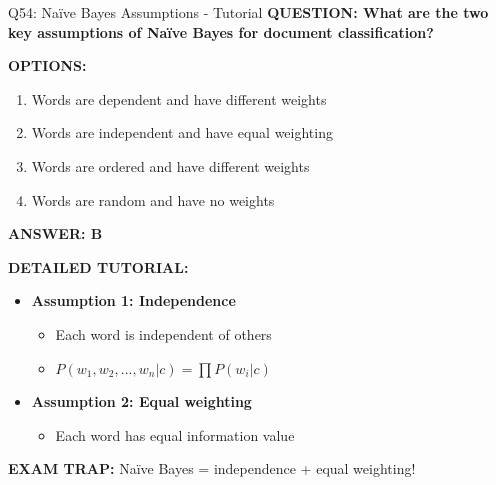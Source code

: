 \documentclass[8pt]{beamer}
\begin{document}
	\begin{frame}{Q54: Naïve Bayes Assumptions - Tutorial}
		\fontsize{6.5}{7.5}\selectfont
		\textbf{QUESTION: What are the two key assumptions of Naïve Bayes for document classification?}
		
		\vspace{0.1cm}
		\textbf{OPTIONS:}
		\begin{enumerate}
			\item Words are dependent and have different weights
			\item Words are independent and have equal weighting
			\item Words are ordered and have different weights
			\item Words are random and have no weights
		\end{enumerate}
		
		\vspace{0.1cm}
		\textcolor{myblue}{\textbf{ANSWER: B}}
		
		\vspace{0.1cm}
		\textbf{DETAILED TUTORIAL:}
		\begin{itemize}
			\item \textbf{Assumption 1: Independence}
			\begin{itemize}
				\item Each word is independent of others
				\item $P(w_1, w_2, ..., w_n|c) = \prod P(w_i|c)$
			\end{itemize}
			\item \textbf{Assumption 2: Equal weighting}
			\begin{itemize}
				\item Each word has equal information value
			\end{itemize}
		\end{itemize}
		
		\textcolor{myred}{\textbf{EXAM TRAP:}} Naïve Bayes = \textcolor{myblue}{independence + equal weighting}!
	\end{frame}
	
\end{document}
